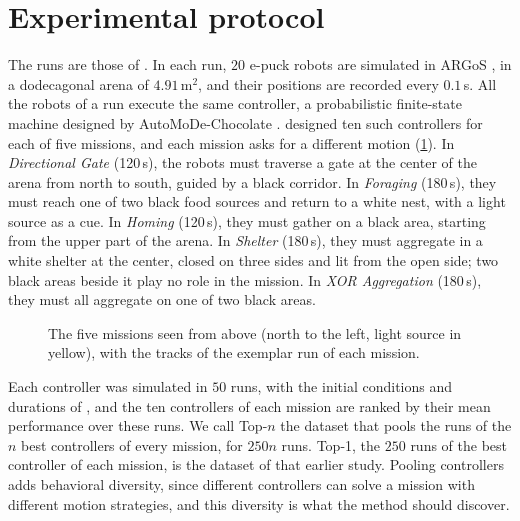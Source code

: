 \documentclass[pdflatex,sn-apa]{sn-jnl}
\begin{document}
\section{Experimental protocol}
\label{sec:protocol}

The runs are those of \citet{legarda2026universal}. In each run, $20$ e-puck robots \citep{mondada2009puck} are
simulated in ARGoS \citep{pinciroli2012argos}, in a dodecagonal arena of $4.91$\,m$^2$, and their positions are
recorded every $0.1$\,s. All the robots of a run execute the same controller, a probabilistic finite-state machine
designed by AutoMoDe-Chocolate \citep{francesca2014automode,francesca2015chocolate}. \citet{hasselmann2021empirical}
designed ten such controllers for each of five missions, and each mission asks for a different motion
(\cref{fig:missions}). In \emph{Directional Gate} (120\,s), the robots must traverse a gate at the center of the arena
from north to south, guided by a black corridor. In \emph{Foraging} (180\,s), they must reach one of two black food
sources and return to a white nest, with a light source as a cue. In \emph{Homing} (120\,s), they must gather on a
black area, starting from the upper part of the arena. In \emph{Shelter} (180\,s), they must aggregate in a white
shelter at the center, closed on three sides and lit from the open side; two black areas beside it play no role in
the mission. In \emph{XOR Aggregation} (180\,s), they must all aggregate on one of two black areas.

\begin{figure}[!htbp]
\centering
{}
\caption{The five missions seen from above (north to the left, light source in yellow), with the tracks of the
exemplar run of each mission.}
\label{fig:missions}
\end{figure}

Each controller was simulated in $50$ runs, with the initial conditions and durations of
\citet{hasselmann2021empirical}, and the ten controllers of each mission are ranked by their mean performance over
these runs. We call Top-$n$ the dataset that pools the runs of the $n$ best controllers of every mission, for $250n$
runs. Top-1, the $250$ runs of the best controller of each mission, is the dataset of that earlier study. Pooling
controllers adds behavioral diversity, since different controllers can solve a mission with different motion
strategies, and this diversity is what the method should discover.
\end{document}
